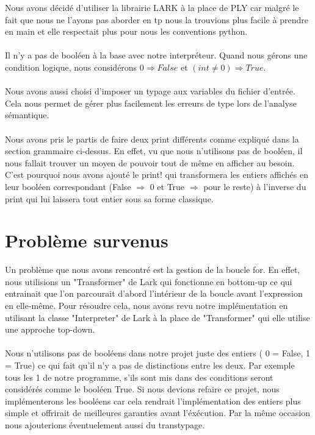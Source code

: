 \documentclass[a4paper, 12pt]{article}
\begin{document}
Nous avons décidé d'utiliser la librairie LARK à la place de PLY car malgré le fait que nous ne l'ayons pas aborder en tp nous la trouvions plus facile à prendre en main et elle respectait plus pour nous les conventions python. \\
\\
Il n'y a pas de booléen à la base avec notre interpréteur. Quand nous gérons une condition logique, nous considérons $ 0 \Rightarrow False$ et $ (int \neq 0) \Rightarrow True$. \\
\\
Nous avons aussi choisi d'imposer un typage aux variables du fichier d'entrée. Cela nous permet de gérer plus facilement les erreurs de type lors de l'analyse sémantique.\\
\\
Nous avons pris le partis de faire deux print différents comme expliqué dans la section grammaire ci-dessus. En effet, vu que nous n'utilisons pas de booléen, il nous fallait trouver un moyen de pouvoir tout de même en afficher au besoin. C'est pourquoi nous avons ajouté le print! qui transformera les entiers affichés en leur booléen correspondant (False $ \Rightarrow $ 0 et True $ \Rightarrow $ pour le reste) à l'inverse du print qui lui laissera tout entier sous sa forme classique.

\section{Problème survenus}

Un problème que nous avons rencontré est la gestion de la boucle for. En effet, nous utilisions un "Transformer" de Lark qui fonctionne en bottom-up ce qui entrainait que l'on parcourait d'abord l'intérieur de la boucle avant l'expression en elle-même. Pour résoudre cela, nous avons revu notre implémentation en utilisant la classe "Interpreter" de Lark à la place de "Transformer" qui elle utilise une approche top-down.\\
\\
Nous n'utilisons pas de booléens dans notre projet juste des entiers ( 0 = False, 1 = True) ce qui fait qu'il n'y a pas de distinctions entre les deux. Par exemple tous les 1 de notre programme, s'ils sont mis dans des conditions seront considérés comme le booléen True. Si nous devions refaire ce projet, nous implémenterons les booléens car cela rendrait l'implémentation des entiers  plus simple et offrirait de meilleures garanties avant l'éxécution. Par la même occasion nous ajouterions éventuelement aussi du transtypage.
\end{document}
